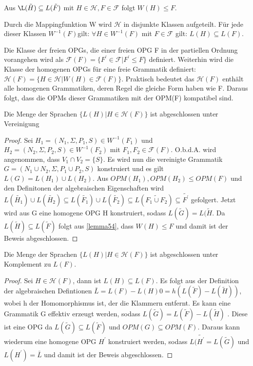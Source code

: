 \begin{lemma}
\label{lemma54}
Aus $\L(\tilde{H}) \subseteq L(\tilde{F})$ mit $H \in \mathcal{H}, F \in \mathcal{F}$ folgt $W(H) \leq F.$
\end{lemma}
Durch die Mappingfunktion W wird $\mathcal{H}$ in disjunkte Klassen aufgeteilt. Für jede dieser Klassen $W^{-1}(F)$gilt:  $\forall H \in W^{-1}(F)$ mit $F\in \mathcal{F}$ gilt: $L(H) \subseteq L(F)$.

 Die Klasse der freien OPGs, die einer freien OPG F in der partiellen Ordnung vorangehen wird als $\mathcal{F}(F)=\{F^\prime \in \mathcal{F} | F^\prime \leq F\}$ definiert. Weiterhin wird die Klasse der homogenen OPGs für eine freie Grammatik definiert: $\mathcal{H}(F)=\{H \in \mathcal{H}|W(H)\in \mathcal{F}(F)\}$. Praktisch bedeutet das $\mathcal{H}(F)$ enthält alle homogenen Grammatiken, deren Regel die gleiche Form haben wie F. Daraus folgt, dass die OPMs dieser Grammatiken mit der OPM(F) kompatibel sind.

\begin{theorem}[Vereinigung]
Die Menge der Sprachen $\{L(H)|H \in \mathcal{H}(F)\}$ ist abgeschlossen unter Vereinigung
\end{theorem}
\begin{proof}
Sei $H_1=(N_1, \Sigma, P_1, S) \in W^{-1}(F_1)$ und $H_2=(N_2, \Sigma, P_2, S) \in W^{-1}(F_2)$ mit $F_1, F_2 \in \mathcal{F}(F)$. O.b.d.A. wird angenommen, dass $V_1 \cap V_2 = \{S\}$. Es wird nun die vereinigte Grammatik $G=(N_1 \cup N_2, \Sigma, P_1 \cup P_2, S)$ konstruiert und es gilt $L(G)=L(H_1) \cup L(H_2)$. Aus $OPM(H_1), OPM(H_2) \leq OPM(F)$ und den Definitonen der algebraischen Eigenschaften wird $L(\tilde{H_1}) \cup L(\tilde{H_2}) \subseteq L(\tilde{F_1}) \cup L(\tilde{F_2}) \subseteq L(\widetilde{F_1 \cup F_2}) \subseteq \tilde{F^\prime}$ gefolgert. Jetzt wird aus G eine homogene OPG H konstruiert, sodass $L(\tilde{G})=L(\tilde{H}$. Da $L(\tilde{H}) \subseteq L(\tilde{F})$ folgt aus \ref{lemma54}, dass $W(H) \leq F$ und damit ist der Beweis abgeschlossen. 
\end{proof}


\begin{theorem}[Komplement]
Die Menge der Sprachen $\{L(H)|H \in \mathcal{H}(F)\}$ ist abgeschlossen unter Komplement zu $L(F)$.
\end{theorem}
\begin{proof}
Sei $H \in \mathcal{H}(F)$, dann ist $L(H) \subseteq L(F)$. Es folgt aus der Definition der algebraischen Defintionen $\bar{L}=L(F)-L(H)0=h(L(\tilde{F}) - L(\tilde{H}))$, wobei h der Homomorphismus ist, der die Klammern entfernt. Es kann eine Grammatik G effektiv erzeugt werden, sodass $L(\tilde{G}) = L( \tilde{F}) - L(\tilde{H})$ \cite{McNaughton}. Diese ist eine OPG da $L(\tilde{G})\subseteq L(\tilde{F})$ und $OPM(G) \subseteq OPM(F)$. Daraus kann wiederum eine homogene OPG $H^\prime$ konstruiert werden, sodass $L(\tilde{H^\prime}=L(\tilde{G})$ und $L(H^\prime) = \bar{L}$ und damit ist der Beweis abgeschlossen.
\end{proof}

